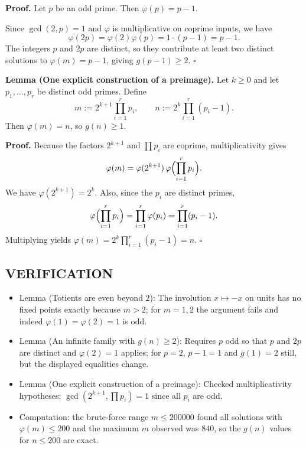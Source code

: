 \noindent\textbf{Proof.}
Let $p$ be an odd prime. Then $\varphi(p)=p-1$.

Since $\gcd(2,p)=1$ and $\varphi$ is multiplicative on coprime inputs, we have
\[
\varphi(2p)=\varphi(2)\varphi(p)=1\cdot (p-1)=p-1.
\]
The integers $p$ and $2p$ are distinct, so they contribute at least two distinct solutions to $\varphi(m)=p-1$, giving $g(p-1)\ge 2$.
\hfill$\square$


\noindent\textbf{Lemma (One explicit construction of a preimage).}
Let $k\ge 0$ and let $p_1,\dots,p_r$ be distinct odd primes. Define
\[
 m := 2^{k+1}\prod_{i=1}^r p_i,\qquad n := 2^k\prod_{i=1}^r (p_i-1).
\]
Then $\varphi(m)=n$, so $g(n)\ge 1$.

\noindent\textbf{Proof.}
Because the factors $2^{k+1}$ and $\prod p_i$ are coprime, multiplicativity gives
\[
\varphi(m)=\varphi(2^{k+1})\,\varphi\Bigl(\prod_{i=1}^r p_i\Bigr).
\]
We have $\varphi(2^{k+1})=2^k$. Also, since the $p_i$ are distinct primes,
\[
\varphi\Bigl(\prod_{i=1}^r p_i\Bigr)=\prod_{i=1}^r \varphi(p_i)=\prod_{i=1}^r (p_i-1).
\]
Multiplying yields $\varphi(m)=2^k\prod_{i=1}^r (p_i-1)=n$.
\hfill$\square$


\subsection*{VERIFICATION}
\begin{itemize}
\item Lemma (Totients are even beyond $2$): The involution $x\mapsto -x$ on units has no fixed points exactly because $m>2$; for $m=1,2$ the argument fails and indeed $\varphi(1)=\varphi(2)=1$ is odd.
\item Lemma (An infinite family with $g(n)\ge 2$): Requires $p$ odd so that $p$ and $2p$ are distinct and $\varphi(2)=1$ applies; for $p=2$, $p-1=1$ and $g(1)=2$ still, but the displayed equalities change.
\item Lemma (One explicit construction of a preimage): Checked multiplicativity hypotheses: $\gcd(2^{k+1},\prod p_i)=1$ since all $p_i$ are odd.
\item Computation: the brute-force range $m\le 200000$ found all solutions with $\varphi(m)\le 200$ and the maximum $m$ observed was $840$, so the $g(n)$ values for $n\le 200$ are exact.
\end{itemize}


